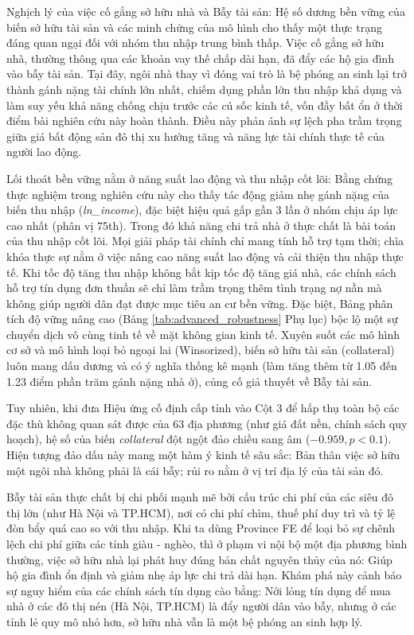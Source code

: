 \documentclass[12pt,a4paper]{report}
\begin{document}
Nghịch lý của việc cố gắng sở hữu nhà và Bẫy tài sản: Hệ số dương bền vững của biến sở hữu tài sản và các minh chứng của mô hình cho thấy một thực trạng đáng quan ngại đối với nhóm thu nhập trung bình thấp. Việc cố gắng sở hữu nhà, thường thông qua các khoản vay thế chấp dài hạn, đã đẩy các hộ gia đình vào bẫy tài sản. Tại đây, ngôi nhà thay vì đóng vai trò là bệ phóng an sinh lại trở thành gánh nặng tài chính lớn nhất, chiếm dụng phần lớn thu nhập khả dụng và làm suy yếu khả năng chống chịu trước các cú sốc kinh tế, vốn đầy bất ổn ở thời điểm bài nghiên cứu này hoàn thành. Điều này phản ánh sự lệch pha trầm trọng giữa giá bất động sản đô thị xu hướng tăng và năng lực tài chính thực tế của người lao động.
	
Lối thoát bền vững nằm ở năng suất lao động và thu nhập cốt lõi: Bằng chứng thực nghiệm trong nghiên cứu này cho thấy tác động giảm nhẹ gánh nặng của biến thu nhập (\textit{ln\_income}), đặc biệt hiệu quả gấp gần 3 lần ở nhóm chịu áp lực cao nhất (phân vị 75th). Trong đó khả năng chi trả nhà ở thực chất là bài toán của thu nhập cốt lõi. Mọi giải pháp tài chính chỉ mang tính hỗ trợ tạm thời; chìa khóa thực sự nằm ở việc nâng cao năng suất lao động và cải thiện thu nhập thực tế. Khi tốc độ tăng thu nhập không bắt kịp tốc độ tăng giá nhà, các chính sách hỗ trợ tín dụng đơn thuần sẽ chỉ làm trầm trọng thêm tình trạng nợ nần mà không giúp người dân đạt được mục tiêu an cư bền vững.
Đặc biệt, Bảng phân tích độ vững nâng cao (Bảng \ref{tab:advanced_robustness} Phụ lục) bộc lộ một sự chuyển dịch vô cùng tinh tế về mặt không gian kinh tế. Xuyên suốt các mô hình cơ sở và mô hình loại bỏ ngoại lai (Winsorized), biến sở hữu tài sản (collateral) luôn mang dấu dương và có ý nghĩa thống kê mạnh (làm tăng thêm từ 1.05 đến 1.23 điểm phần trăm gánh nặng nhà ở), củng cố giả thuyết về Bẫy tài sản. 

Tuy nhiên, khi đưa Hiệu ứng cố định cấp tỉnh vào Cột 3 để hấp thụ toàn bộ các đặc thù không quan sát được của 63 địa phương (như giá đất nền, chính sách quy hoạch), hệ số của biến \textit{collateral} đột ngột đảo chiều sang âm ($-0.959, p<0.1$). Hiện tượng đảo dấu này mang một hàm ý kinh tế sâu sắc: Bản thân việc sở hữu một ngôi nhà không phải là cái bẫy; rủi ro nằm ở vị trí địa lý của tài sản đó. 

Bẫy tài sản thực chất bị chi phối mạnh mẽ bởi cấu trúc chi phí của các siêu đô thị lớn (như Hà Nội và TP.HCM), nơi có chi phí chìm, thuế phí duy trì và tỷ lệ đòn bẩy quá cao so với thu nhập. Khi ta dùng Province FE để loại bỏ sự chênh lệch chi phí giữa các tỉnh giàu - nghèo, thì ở phạm vi nội bộ một địa phương bình thường, việc sở hữu nhà lại phát huy đúng bản chất nguyên thủy của nó: Giúp hộ gia đình ổn định và giảm nhẹ áp lực chi trả dài hạn. Khám phá này cảnh báo sự nguy hiểm của các chính sách tín dụng cào bằng: Nới lỏng tín dụng để mua nhà ở các đô thị nén (Hà Nội, TP.HCM) là đẩy người dân vào bẫy, nhưng ở các tỉnh lẻ quy mô nhỏ hơn, sở hữu nhà vẫn là một bệ phóng an sinh hợp lý.
\end{document}
